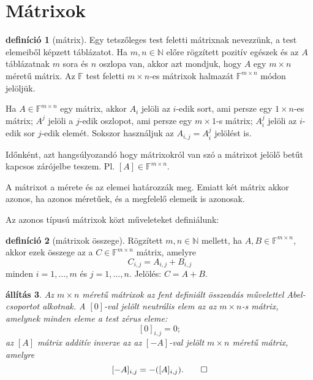 \documentclass[9pt, a4paper, showtrims]{memoir}
\theoremstyle{plain}
\newtheorem{proposition}{állítás}[chapter]
\theoremstyle{remark}
\theoremstyle{definition}
\newtheorem{definition}[proposition]{definíció}
\begin{document}
\section{Mátrixok}
\begin{definition}[mátrix]
	Egy tetszőleges test feletti mátrixnak nevezzünk,
	a test elemeiből képzett táblázatot.
	Ha $m,n\in\mathbb{N}$ előre rögzített pozitív egészek és
	az $A$ táblázatnak $m$ sora és $n$ oszlopa van,
	akkor azt mondjuk, hogy $A$ egy $m\times n$ méretű mátrix.
	Az $\mathbb{F}$ test feletti $m\times n$-es mátrixok halmazát $\mathbb{F}^{m\times n}$
	módon jelöljük.

	Ha $A\in\mathbb{F}^{m\times n}$ egy mátrix,
	akkor $A_i$ jelöli az $i$-edik sort, ami persze egy $1\times n$-es mátrix;
	$A^j$ jelöli a $j$-edik oszlopot, ami persze egy $m\times 1$-s mátrix;
	$A_i^j$ jelöli az $i$-edik sor $j$-edik elemét.
	Sokszor használjuk az $A_{i,j}=A_i^j$ jelölést is.

	Időnként, azt hangsúlyozandó hogy mátrixokról van szó a mátrixot jelölő betűt kapcsos zárójelbe teszem.
	Pl. $\left[ A \right]\in\mathbb{F}^{m\times n}$.

	A mátrixot a mérete és az elemei határozzák meg.
	Emiatt két mátrix akkor azonos, ha azonos méretűek, és a megfelelő elemeik is azonosak.
\end{definition}
Az azonos típusú mátrixok közt műveleteket definiálunk:
\begin{definition}[mátrixok összege]
	Rögzített $m,n\in\mathbb{N}$ mellett, ha $A,B\in\mathbb{F}^{m\times n}$,
	akkor ezek összege az a $C\in\mathbb{F}^{m\times n}$ mátrix, amelyre
	\[
		C_{i,j}=A_{i,j}+B_{i,j}
	\]
	minden $i=1,\ldots,m$ és $j=1,\ldots, n$.
	Jelölés: $C=A+B$.
\end{definition}
\begin{proposition}\label{pr:matrixokVS1}
	Az $m\times n$ méretű mátrixok az fent definiált összeadás művelettel
	Abel-csoportot alkotnak.
	A $[0]$-val jelölt neutrális elem az az $m\times n$-s mátrix,
	amelynek minden eleme a test zérus eleme:
	\[
		[0]_{i,j}=0;
	\]
	az $[A]$ mátrix additív inverze az az $[-A]$-val jelölt $m\times n$ méretű mátrix,
	amelyre
	\[
		[-A]_{i,j}=-([A]_{i,j}).\qedhere
	\]
\end{proposition}
\end{document}
